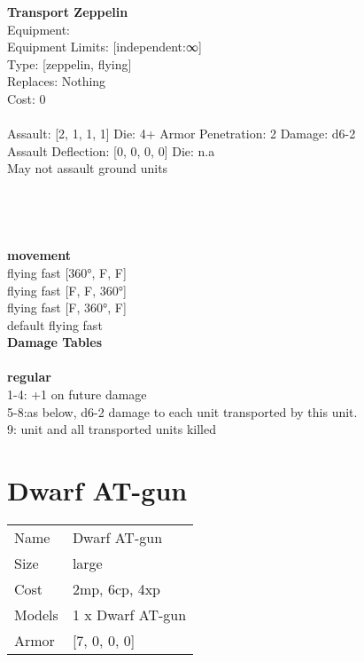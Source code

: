 {\bf Transport Zeppelin } \\
Equipment:  \\
Equipment Limits: [independent:∞] \\
Type: [zeppelin, flying] \\
Replaces: Nothing \\
Cost: 0\\
\ \\
Assault: [2, 1, 1, 1] Die: 4+ Armor Penetration: 2 Damage: d6-2 \\
Assault Deflection: [0, 0, 0, 0] Die: n.a\\
\indent May not assault ground units\\ 
 
\ \\

\ \\
 
\ \\



\ \\ {\bf movement } \\
flying fast [360°, F, F] \\
flying fast [F, F, 360°] \\
flying fast [F, 360°, F] \\
default flying fast \\


{\bf Damage Tables} \\
\ \\ {\bf regular } \\
1-4: +1 on future damage \\
5-8:as below, d6-2 damage to each unit transported by this unit. \\
9: unit and all transported units killed \\










\pagebreak\pagebreak

\section{ Dwarf AT-gun }

\begin{tabular}{ll}
  Name & Dwarf AT-gun \\
  Size & large\\
  Cost & 2mp, 6cp, 4xp\\
  Models & 1 x Dwarf AT-gun\\
  Armor & [7, 0, 0, 0]\\
\end{tabular}

